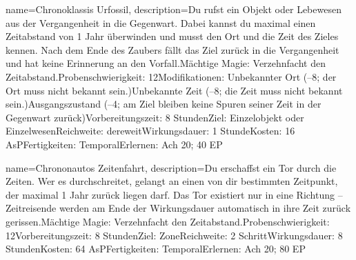{
    name={Chronoklassis Urfossil},
    description={Du rufst ein Objekt oder Lebewesen aus der Vergangenheit in die Gegenwart. Dabei kannst du maximal einen Zeitabstand von 1 Jahr überwinden und musst den Ort und die Zeit des Zieles kennen. Nach dem Ende des Zaubers fällt das Ziel zurück in die Vergangenheit und hat keine Erinnerung an den Vorfall.\newline Mächtige Magie: Verzehnfacht den Zeitabstand.\newline Probenschwierigkeit: 12\newline Modifikationen: Unbekannter Ort (–8; der Ort muss nicht bekannt sein.)\newline Unbekannte Zeit (–8; die Zeit muss nicht bekannt sein.)\newline Ausgangszustand (–4; am Ziel bleiben keine Spuren seiner Zeit in der Gegenwart zurück)\newline Vorbereitungszeit: 8 Stunden\newline Ziel: Einzelobjekt oder Einzelwesen\newline Reichweite: dereweit\newline Wirkungsdauer: 1 Stunde\newline Kosten: 16 AsP\newline Fertigkeiten: Temporal\newline Erlernen: Ach 20; 40 EP}
}


{
    name={Chrononautos Zeitenfahrt},
    description={Du erschaffst ein Tor durch die Zeiten. Wer es durchschreitet, gelangt an einen von dir bestimmten Zeitpunkt, der maximal 1 Jahr zurück liegen darf. Das Tor existiert nur in eine Richtung – Zeitreisende werden am Ende der Wirkungsdauer automatisch in ihre Zeit zurück gerissen.\newline Mächtige Magie: Verzehnfacht den Zeitabstand.\newline Probenschwierigkeit: 12\newline Vorbereitungszeit: 8 Stunden\newline Ziel: Zone\newline Reichweite: 2 Schritt\newline Wirkungsdauer: 8 Stunden\newline Kosten: 64 AsP\newline Fertigkeiten: Temporal\newline Erlernen: Ach 20; 80 EP}
}


